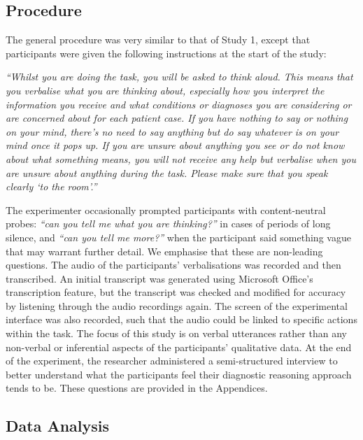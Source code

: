 \documentclass[a4paper, nobind]{templates/ociamthesis}
\begin{document}
\hypertarget{procedure-1}{%
\subsection*{Procedure}\label{procedure-1}}

The general procedure was very similar to that of Study 1, except that participants were given the following instructions at the start of the study:

\emph{``Whilst you are doing the task, you will be asked to think aloud. This means that you verbalise what you are thinking about, especially how you interpret the information you receive and what conditions or diagnoses you are considering or are concerned about for each patient case. If you have nothing to say or nothing on your mind, there's no need to say anything but do say whatever is on your mind once it pops up. If you are unsure about anything you see or do not know about what something means, you will not receive any help but verbalise when you are unsure about anything during the task. Please make sure that you speak clearly `to the room'.''}

The experimenter occasionally prompted participants with content-neutral probes: \emph{``can you tell me what you are thinking?''} in cases of periods of long silence, and \emph{``can you tell me more?''} when the participant said something vague that may warrant further detail. We emphasise that these are non-leading questions. The audio of the participants' verbalisations was recorded and then transcribed. An initial transcript was generated using Microsoft Office's transcription feature, but the transcript was checked and modified for accuracy by listening through the audio recordings again. The screen of the experimental interface was also recorded, such that the audio could be linked to specific actions within the task. The focus of this study is on verbal utterances rather than any non-verbal or inferential aspects of the participants' qualitative data. At the end of the experiment, the researcher administered a semi-structured interview to better understand what the participants feel their diagnostic reasoning approach tends to be. These questions are provided in the Appendices.

\hypertarget{data-analysis-1}{%
\subsection*{Data Analysis}\label{data-analysis-1}}
\end{document}
